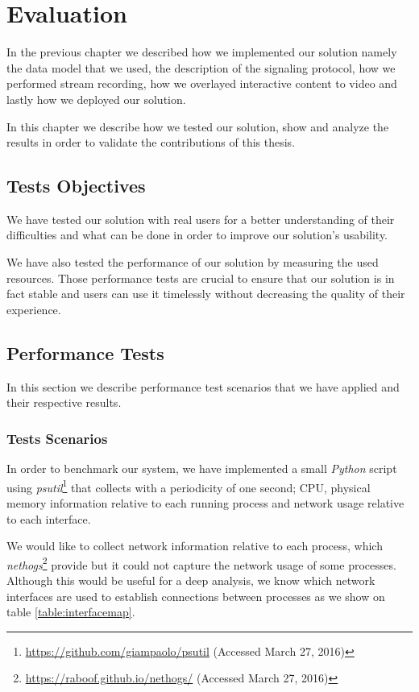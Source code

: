 \chapter{Evaluation}
\label{chapter:evaluation}
  In the previous chapter we described how we implemented our solution namely the data model that we used, the description of the signaling protocol, how we performed stream recording, how we overlayed interactive content to video and lastly how we deployed our solution. 

  In this chapter we describe how we tested our solution, show and analyze the results in order to validate the contributions of this thesis.

\section{Tests Objectives}

  We have tested our solution with real users for a better understanding of their difficulties and what can be done in order to improve our solution's usability.

  We have also tested the performance of our solution by measuring the used resources. Those performance tests are crucial to ensure that our solution is in fact stable and users can use it timelessly without decreasing the quality of their experience. 


  \section {Performance Tests}

     In this section we describe performance test scenarios that we have applied and their respective results.


    \subsection{Tests Scenarios}


      In order to benchmark our system, we have implemented a small \emph{Python} script using \emph{psutil}\footnote{\url{https://github.com/giampaolo/psutil} (Accessed March 27, 2016)} that collects with a periodicity of one second; CPU, physical memory information relative to each running process and network usage relative to each interface. 

      We would like to collect network information relative to each process, which \emph{nethogs}\footnote{\url{https://raboof.github.io/nethogs/} (Accessed March 27, 2016)} provide but it could not capture the network usage of some processes. Although this would be useful for a deep analysis, we know which network interfaces are used to establish connections between processes as we show on table \ref{table:interfacemap}.

